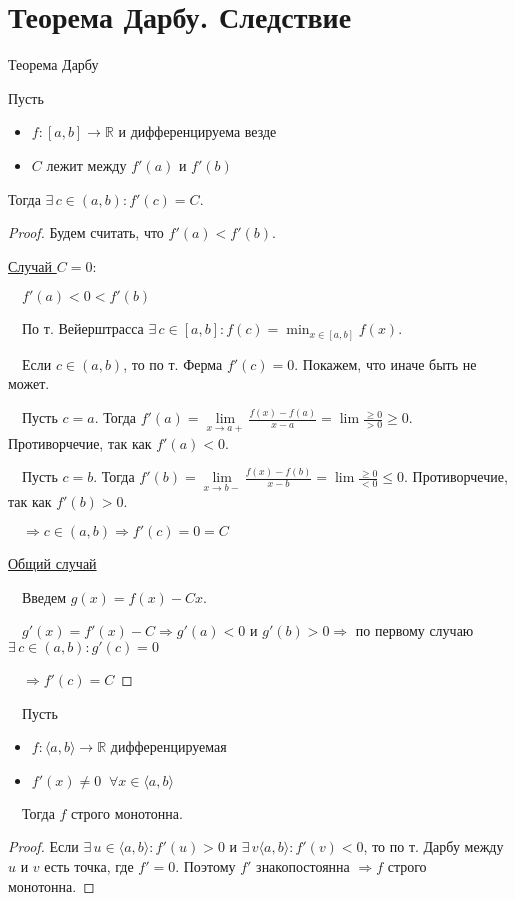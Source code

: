 \section{Теорема Дарбу. Следствие}
\begin{theorem-non}
    Теорема Дарбу

    Пусть 
    \begin{itemize}
        \item $f: [a, b] \to \mathbb{R}$ и дифференцируема везде
        \item $C$ лежит между $f'(a)$ и $f'(b)$
    \end{itemize}
    Тогда $\exists \, c \in (a, b) : f'(c) = C$.
\end{theorem-non}
\begin{proof}
    Будем считать, что $f'(a) < f'(b)$.

    \underline{Случай $C = 0$}:

    $\quad f'(a) < 0 < f'(b)$

    $\quad$По т. Вейерштрасса $\exists \, c \in [a, b] : f(c) = \min_{x \in [a, b]} f(x)$. 
    
    $\quad$Если $c \in (a, b)$, то по т. Ферма $f'(c) = 0$. Покажем, что иначе быть не может.

    $\quad$Пусть $c = a$. Тогда $f'(a) = \lim\limits_{x \to a+} \frac{f(x) - f(a)}{x - a} = \lim \frac{\geqslant 0}{> 0} \geqslant 0$. Противорчечие, так как $f'(a) < 0$.

    $\quad$Пусть $c = b$. Тогда $f'(b) = \lim\limits_{x \to b-} \frac{f(x) - f(b)}{x - b} = \lim \frac{\geqslant 0}{< 0} \leqslant 0$. Противорчечие, так как $f'(b) > 0$.

    $\quad \Rightarrow c \in (a, b) \Rightarrow f'(c) = 0 = C$
    
    \underline{Общий случай}

    $\quad$Введем $g(x) = f(x) - Cx$. 

    $\quad g'(x) = f'(x) - C \Rightarrow g'(a) < 0$ и $g'(b) > 0 \Rightarrow$ по первому случаю $\exists \, c \in (a, b) : g'(c) = 0$
    
    $\quad \Rightarrow f'(c) = C$
\end{proof}
\begin{follow} 

    $\quad$Пусть
    \begin{itemize}
        \item $f: \langle a, b \rangle \to \mathbb{R}$ дифференцируемая
        \item $f'(x) \neq 0 \;\; \forall x \in \langle a, b \rangle$
    \end{itemize}    
    $\quad$Тогда $f$ строго монотонна.
\end{follow}
\begin{proof}
    Если $\exists \, u \in \langle a, b \rangle : f'(u) > 0$ и $\exists \, v \langle a, b \rangle : f'(v) < 0$, то по т. Дарбу между $u$ и $v$ есть точка, где $f' = 0$. Поэтому $f'$ знакопостоянна $\Rightarrow f$ строго монотонна. 
\end{proof}